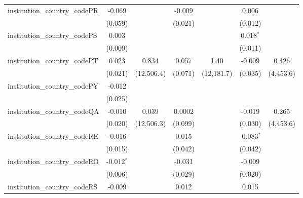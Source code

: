 \begin{tabular}{lcccccc}
   institution\_country\_codePR          & -0.069         &               & -0.009        &               & 0.006         &   \\   
                                         & (0.059)        &               & (0.021)       &               & (0.012)       &   \\   
   institution\_country\_codePS          & 0.003          &               &               &               & 0.018$^{*}$   &   \\   
                                         & (0.009)        &               &               &               & (0.011)       &   \\   
   institution\_country\_codePT          & 0.023          & 0.834         & 0.057         & 1.40          & -0.009        & 0.426\\   
                                         & (0.021)        & (12,506.4)    & (0.071)       & (12,181.7)    & (0.035)       & (4,453.6)\\   
   institution\_country\_codePY          & -0.012         &               &               &               &               &   \\   
                                         & (0.025)        &               &               &               &               &   \\   
   institution\_country\_codeQA          & -0.010         & 0.039         & 0.0002        &               & -0.019        & 0.265\\   
                                         & (0.020)        & (12,506.3)    & (0.099)       &               & (0.030)       & (4,453.6)\\   
   institution\_country\_codeRE          & -0.016         &               & 0.015         &               & -0.083$^{*}$  &   \\   
                                         & (0.015)        &               & (0.042)       &               & (0.042)       &   \\   
   institution\_country\_codeRO          & -0.012$^{*}$   &               & -0.031        &               & -0.009        &   \\   
                                         & (0.006)        &               & (0.029)       &               & (0.020)       &   \\   
   institution\_country\_codeRS          & -0.009         &               & 0.012         &               & 0.015         &   \\   

\end{tabular}
